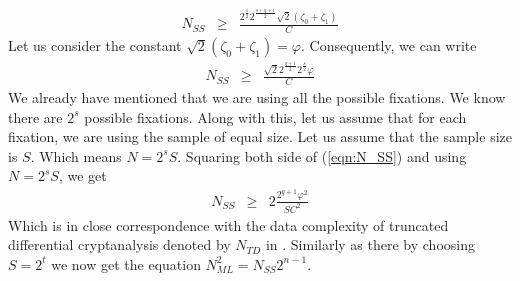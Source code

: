 \begin{eqnarray*}
N_{SS} &\geq & \frac{2^{\frac{1}{2}}2^\frac{s+q+1}{2}\sqrt{2}\left(\zeta_0 + \zeta_1 \right)}{C}
\end{eqnarray*}
Let us consider the constant $\sqrt{2}\left(\zeta_0 + \zeta_1 \right) = \varphi$. Consequently, we can write
\begin{eqnarray}
N_{SS} &\geq & \frac{\sqrt{2}2^\frac{q+1}{2}2^{\frac{s}{2}}\varphi}{C} \label{eqn:N_SS}
\end{eqnarray}
We already have mentioned that we are using all the possible fixations. We know there are $2^s$ possible fixations. Along with this, let us assume that for each fixation, we are using the sample of equal size. Let us assume that the sample size is $S$. Which means $N = 2^s S$. Squaring both side of (\ref{eqn:N_SS}) and using $N = 2^s S$, we get
\begin{eqnarray}
N_{SS} &\geq & 2 \frac{2^{q+1}\varphi^2}{SC^2} \label{eqn:N_SS_final}
\end{eqnarray}
Which is in close correspondence with the data complexity of truncated differential cryptanalysis denoted by $N_{TD}$ in \cite{Celine_Kaisa_Links_2014}. Similarly as there by choosing $S = 2^t$ we now get the equation $N^2_{ML} = N_{SS}2^{n-1}$.
